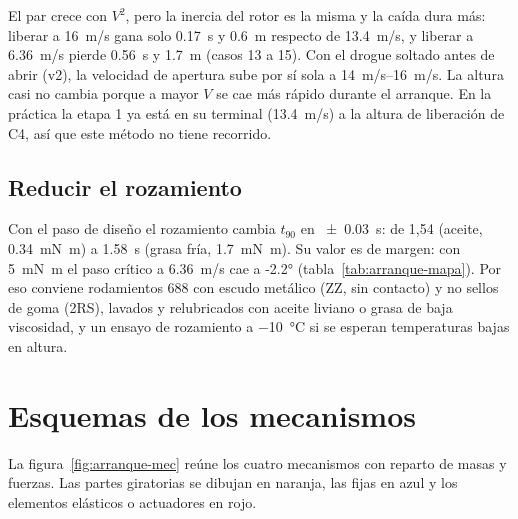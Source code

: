 El par crece con $V^2$, pero la inercia del rotor es la misma y la caída dura más: liberar a
\SI{16}{m/s} gana solo \SI{0.17}{s} y \SI{0.6}{m} respecto de \SI{13.4}{m/s}, y liberar a
\SI{6.36}{m/s} pierde \SI{0.56}{s} y \SI{1.7}{m} (casos 13 a 15). Con el drogue soltado antes
de abrir (v2), la velocidad de apertura sube por sí sola a \SIrange{14}{16}{m/s}. La altura casi no cambia
porque a mayor $V$ se cae más rápido durante el arranque. En la práctica la etapa 1 ya está
en su terminal (\SI{13.4}{m/s}) a la altura de liberación de C4, así que este método no tiene
recorrido.

\subsection{Reducir el rozamiento}

Con el paso de diseño el rozamiento cambia $t_{90}$ en \SI{\pm0.03}{s}: de 1,54 (aceite,
\SI{0.34}{mN.m}) a \SI{1.58}{s} (grasa fría, \SI{1.7}{mN.m}). Su valor es de margen: con
\SI{5}{mN.m} el paso crítico a \SI{6.36}{m/s} cae a \ang{-2.2} (tabla~\ref{tab:arranque-mapa}).
Por eso conviene rodamientos 688 con escudo metálico (ZZ, sin contacto) y no sellos de goma
(2RS), lavados y relubricados con aceite liviano o grasa de baja viscosidad, y un ensayo de
rozamiento a \SI{-10}{\celsius} si se esperan temperaturas bajas en altura.

\section{Esquemas de los mecanismos}\label{sec:arranque-esquemas}

La figura~\ref{fig:arranque-mec} reúne los cuatro mecanismos con reparto de masas y
fuerzas. Las partes giratorias se dibujan en naranja, las fijas en azul y los elementos
elásticos o actuadores en rojo.

